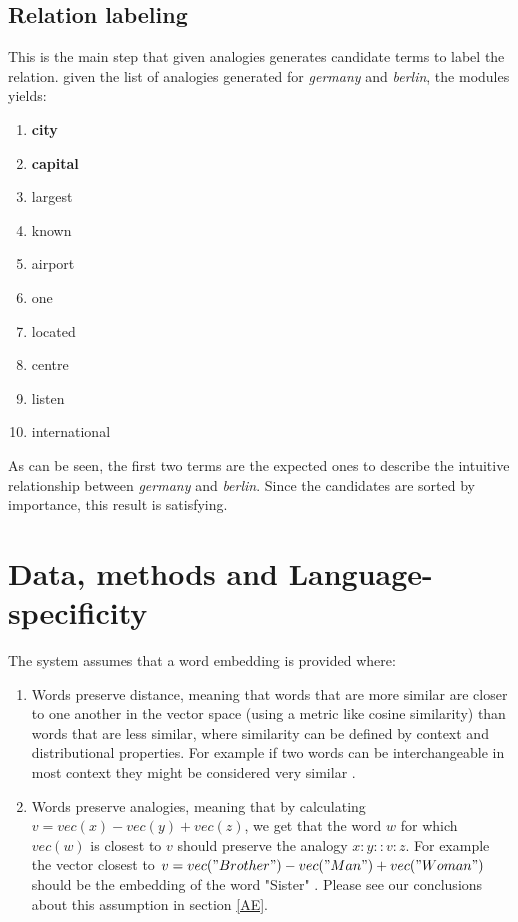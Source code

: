 \documentclass[11pt,a4paper]{article}
\begin{document}
\subsection{Relation labeling}
This is the main step that given analogies generates candidate terms to label the relation. given the list of analogies generated for \textit{germany} and \textit{berlin}, the modules yields:
\begin{enumerate}
\itemsep0em 
\item \textbf{city}
\item \textbf{capital}
\item largest
\item known
\item airport
\item one
\item located
\item centre
\item listen
\item international
\end{enumerate}
As can be seen, the first two terms are the expected ones to describe the intuitive relationship between \textit{germany} and \textit{berlin}. Since the candidates are sorted by importance, this result is satisfying.

\section{Data, methods and Language-specificity}
The system assumes that a word embedding is provided where:
\begin{enumerate}
\item Words preserve distance, meaning that words that are more similar are closer to one another in the vector space (using a metric like cosine similarity) 
than words that are less similar, where similarity can be defined by context and distributional properties. For example if two words can be 
interchangeable in most context they might be considered very similar \cite{mikolov2013linguistic}.
\item Words preserve analogies, meaning that by calculating $v = vec(x) - vec(y) + vec(z)$, we get that the word $w$ for which $vec(w)$ is 
closest to $v$ should preserve the analogy $x:y::v:z$. For example the vector closest to $v = vec("Brother") - vec("Man") + vec("Woman")$ should be 
the embedding of the word "Sister" \cite{mikolov2013linguistic}. Please see our conclusions about this assumption in section \ref{AE}.
\end{enumerate}
\end{document}
